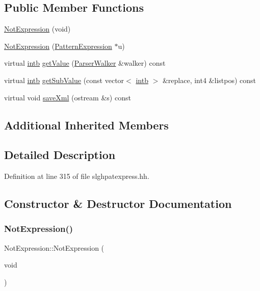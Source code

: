 \subsection*{Public Member Functions}
\begin{DoxyCompactItemize}
\item 
\mbox{\hyperlink{class_not_expression_aa9ed4b0bf7b744d4f4edc5f79f96d626}{Not\+Expression}} (void)
\item 
\mbox{\hyperlink{class_not_expression_aea42aec33abda32617b495af71f24fed}{Not\+Expression}} (\mbox{\hyperlink{class_pattern_expression}{Pattern\+Expression}} $\ast$u)
\item 
virtual \mbox{\hyperlink{types_8h_aa925ba3e627c2df89d5b1cfe84fb8572}{intb}} \mbox{\hyperlink{class_not_expression_a6122ccadabed688967cfa502d76d4b31}{get\+Value}} (\mbox{\hyperlink{class_parser_walker}{Parser\+Walker}} \&walker) const
\item 
virtual \mbox{\hyperlink{types_8h_aa925ba3e627c2df89d5b1cfe84fb8572}{intb}} \mbox{\hyperlink{class_not_expression_adcb19bdd1315934c96daabebf3010175}{get\+Sub\+Value}} (const vector$<$ \mbox{\hyperlink{types_8h_aa925ba3e627c2df89d5b1cfe84fb8572}{intb}} $>$ \&replace, int4 \&listpos) const
\item 
virtual void \mbox{\hyperlink{class_not_expression_aa0d7fd2da95e71dfe35664328b219ebb}{save\+Xml}} (ostream \&s) const
\end{DoxyCompactItemize}
\subsection*{Additional Inherited Members}


\subsection{Detailed Description}


Definition at line 315 of file slghpatexpress.\+hh.



\subsection{Constructor \& Destructor Documentation}
\mbox{\label{class_not_expression_aa9ed4b0bf7b744d4f4edc5f79f96d626}} 
\subsubsection{\texorpdfstring{NotExpression()}{NotExpression()}\hspace{0.1cm}{\footnotesize\ttfamily [1/2]}}
{\footnotesize\ttfamily Not\+Expression\+::\+Not\+Expression (\begin{DoxyParamCaption}\item[{void}]{ }\end{DoxyParamCaption})\hspace{0.3cm}{\ttfamily [inline]}}




